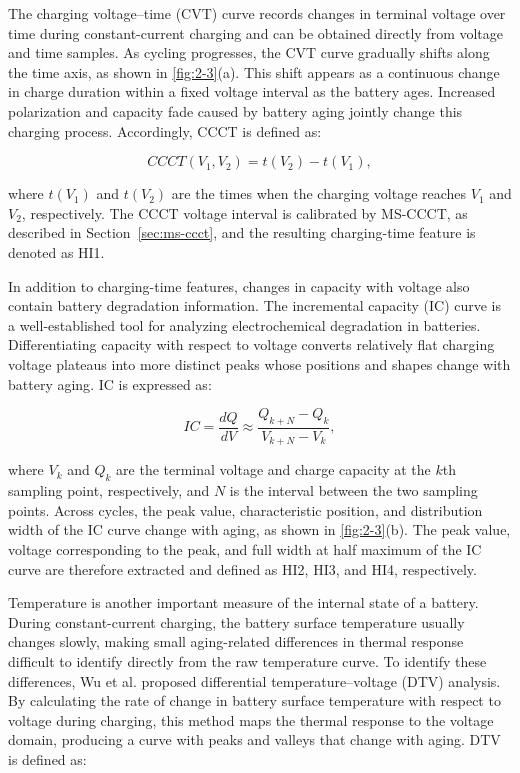 The charging voltage--time (CVT) curve records changes in terminal voltage over time during constant-current charging and can be obtained directly from voltage and time samples. As cycling progresses, the CVT curve gradually shifts along the time axis, as shown in \cref{fig:2-3}(a). This shift appears as a continuous change in charge duration within a fixed voltage interval as the battery ages. Increased polarization and capacity fade caused by battery aging jointly change this charging process\cite{ref64,ref63}. Accordingly, CCCT is defined as:

\begin{equation}
CCCT(V_1,V_2)=t(V_2)-t(V_1),
\end{equation}

where $t(V_1)$ and $t(V_2)$ are the times when the charging voltage reaches $V_1$ and $V_2$, respectively. The CCCT voltage interval is calibrated by MS-CCCT, as described in Section~\ref{sec:ms-ccct}, and the resulting charging-time feature is denoted as HI1.

In addition to charging-time features, changes in capacity with voltage also contain battery degradation information. The incremental capacity (IC) curve is a well-established tool for analyzing electrochemical degradation in batteries. Differentiating capacity with respect to voltage converts relatively flat charging voltage plateaus into more distinct peaks whose positions and shapes change with battery aging\cite{ref64,ref50}. IC is expressed as:

\begin{equation}
IC=\frac{dQ}{dV}\approx\frac{Q_{k+N}-Q_k}{V_{k+N}-V_k},
\end{equation}

where $V_k$ and $Q_k$ are the terminal voltage and charge capacity at the $k$th sampling point, respectively, and $N$ is the interval between the two sampling points. Across cycles, the peak value, characteristic position, and distribution width of the IC curve change with aging, as shown in \cref{fig:2-3}(b). The peak value, voltage corresponding to the peak, and full width at half maximum of the IC curve are therefore extracted and defined as HI2, HI3, and HI4, respectively.

Temperature is another important measure of the internal state of a battery. During constant-current charging, the battery surface temperature usually changes slowly, making small aging-related differences in thermal response difficult to identify directly from the raw temperature curve. To identify these differences, Wu et al.\cite{ref65} proposed differential temperature--voltage (DTV) analysis. By calculating the rate of change in battery surface temperature with respect to voltage during charging, this method maps the thermal response to the voltage domain, producing a curve with peaks and valleys that change with aging\cite{ref64}. DTV is defined as:

